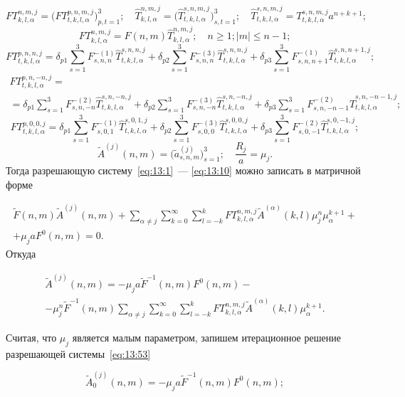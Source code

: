 \begin{equation*}
FT_{k,l,\alpha}^{n,m,j}=\bigg(FT_{t,k,l,\alpha}^{p,n,m,j}\bigg)_{p,t=1}^3;\quad
\hat T_{k,l,\alpha}^{n,m,j}=\bigg(\hat T_{t,k,l,\alpha}^{s,n,m,j}\bigg)_{s,t=1}^3;\quad
\hat T_{t,k,l,\alpha}^{s,n,m,j}=T_{t,k,l,\alpha}^{s,n,m,j} a^{n+k+1};
\end{equation*}
$$
FT_{k,l,\alpha}^{n,m,j}=F(n,m)\hat T_{k,l,\alpha}^{n,m,j};\quad n\ge 1; |m|\le n-1;
$$
$$
FT_{t,k,l,\alpha}^{p,n,n,j}=\delta_{p1}\sum_{s=1}^3 F_{s,n,n}^{-(1)}\hat T_{t,k,l,\alpha}^{s,n,n,j}+\delta_{p2}\sum_{s=1}^3 F_{s,n,n}^{-(3)}\hat T_{t,k,l,\alpha}^{s,n,n,j}+\delta_{p3}\sum_{s=1}^3 F_{s,n,n+1}^{-(1)}\hat T_{t,k,l,\alpha}^{s,n,n+1,j};
$$
\begin{multline*}
FT_{t,k,l,\alpha}^{p,n,-n,j}= \\
=\delta_{p1}\sum_{s=1}^3 F_{s,n,-n}^{-(2)}\hat T_{t,k,l,\alpha}^{s,n,-n,j}+\delta_{p2}\sum_{s=1}^3 F_{s,n,-n}^{-(3)}\hat T_{t,k,l,\alpha}^{s,n,-n,j}+\delta_{p3}\sum_{s=1}^3 F_{s,n,-n-1}^{-(2)}\hat T_{t,k,l,\alpha}^{s,n,-n-1,j};
\end{multline*}
$$
FT_{t,k,l,\alpha}^{p,0,0,j}=\delta_{p1}\sum_{s=1}^3 F_{s,0,1}^{-(1)}\hat T_{t,k,l,\alpha}^{s,0,1,j}+\delta_{p2}\sum_{s=1}^3 F_{s,0,0}^{-(3)}\hat T_{t,k,l,\alpha}^{s,0,0,j}+\delta_{p3}\sum_{s=1}^3 F_{s,0,-1}^{-(2)}\hat T_{t,k,l,\alpha}^{s,0,-1,j};
$$
$$
\tilde A^{(j)}(n,m)=\bigg(\tilde a_{s,n,m}^{(j)}\bigg)_{s=1}^3;\quad \frac{R_j}{a}=\mu_j.
$$
Тогда разрешающую систему~\eqref{eq:13:1}~--- \eqref{eq:13:10} можно записать в матричной форме

\begin{multline}
\tilde F(n,m)\tilde A^{(j)}(n,m)+\sum_{\alpha\neq j}\sum_{k=0}^\infty\sum_{l=-k}^k FT_{k,l,\alpha}^{n,m,j}\tilde A^{(\alpha)}(k,l)\mu_j^n\mu_\alpha^{k+1}+ \\
+\mu_j a F^0(n,m)=0.
\label{eq:13:52}
\end{multline}
Откуда

\begin{multline}
\tilde A^{(j)}(n,m)=-\mu_j a \tilde F^{-1}(n,m)F^0(n,m)- \\
-\mu_j^n\tilde F^{-1}(n,m)\sum_{\alpha\neq j}\sum_{k=0}^\infty\sum_{l=-k}^k FT_{k,l,\alpha}^{n,m,j}\tilde A^{(\alpha)}(k,l)\mu_\alpha^{k+1}.
\label{eq:13:53}
\end{multline}

Считая, что $\mu_j$ является малым параметром, запишем итерационное решение разрешающей системы~\eqref{eq:13:53}

\begin{equation}
\tilde A_0^{(j)}(n,m)=-\mu_j a \tilde F^{-1}(n,m)F^0(n,m);
\label{eq:13:54}
\end{equation}


